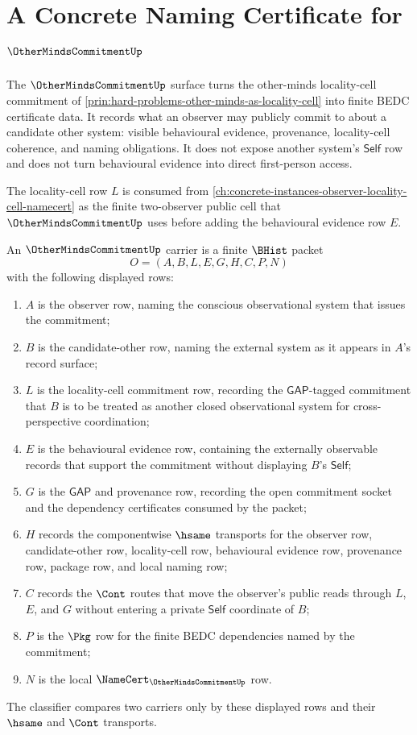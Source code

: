 \chapter{A Concrete Naming Certificate for $\OtherMindsCommitmentUp$}
\label{ch:concrete-instances-othermindscommitment-namecert}

The $\OtherMindsCommitmentUp$ surface turns the other-minds locality-cell commitment of \autoref{prin:hard-problems-other-minds-as-locality-cell} into finite BEDC certificate data. It records what an observer may publicly commit to about a candidate other system: visible behavioural evidence, provenance, locality-cell coherence, and naming obligations. It does not expose another system's $\mathsf{Self}$ row and does not turn behavioural evidence into direct first-person access.

The locality-cell row $L$ is consumed from \autoref{ch:concrete-instances-observer-locality-cell-namecert} as the finite two-observer public cell that $\OtherMindsCommitmentUp$ uses before adding the behavioural evidence row $E$.

\begin{definition}
\label{def:other-minds-commitment-carrier}
An $\OtherMindsCommitmentUp$ carrier is a finite $\BHist$ packet
$$
O=(A,B,L,E,G,H,C,P,N)
$$
with the following displayed rows:
\begin{enumerate}
\item $A$ is the observer row, naming the conscious observational system that issues the commitment;
\item $B$ is the candidate-other row, naming the external system as it appears in $A$'s record surface;
\item $L$ is the locality-cell commitment row, recording the $\mathsf{GAP}$-tagged commitment that $B$ is to be treated as another closed observational system for cross-perspective coordination;
\item $E$ is the behavioural evidence row, containing the externally observable records that support the commitment without displaying $B$'s $\mathsf{Self}$;
\item $G$ is the $\mathsf{GAP}$ and provenance row, recording the open commitment socket and the dependency certificates consumed by the packet;
\item $H$ records the componentwise $\hsame$ transports for the observer row, candidate-other row, locality-cell row, behavioural evidence row, provenance row, package row, and local naming row;
\item $C$ records the $\Cont$ routes that move the observer's public reads through $L$, $E$, and $G$ without entering a private $\mathsf{Self}$ coordinate of $B$;
\item $P$ is the $\Pkg$ row for the finite BEDC dependencies named by the commitment;
\item $N$ is the local $\NameCert_{\OtherMindsCommitmentUp}$ row.
\end{enumerate}
The classifier compares two carriers only by these displayed rows and their $\hsame$ and $\Cont$ transports.
\end{definition}


